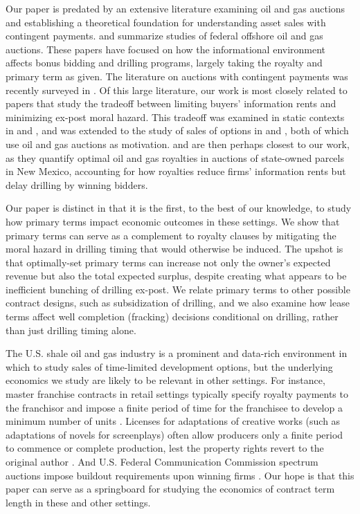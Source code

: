 \documentclass[12pt]{article}
\begin{document}
Our paper is predated by an extensive literature examining oil and gas auctions and establishing a theoretical foundation for understanding asset sales with contingent payments. \citet{bib:porter} and \citet{bib:haile} summarize studies of federal offshore oil and gas auctions. These papers have focused on how the informational environment affects bonus bidding and drilling programs, largely taking the royalty and primary term as given. The literature on auctions with contingent payments was recently surveyed in \citet{bib:skrzypacz}. Of this large literature, our work is most closely related to papers that study the tradeoff between limiting buyers' information rents and minimizing ex-post moral hazard. This tradeoff was examined in static contexts in \citet{bib:laffonttirole1986} and \citet{bib:mcafee}, and was extended to the study of sales of options in \citet{bib:board} and \citet{bib:cong}, both of which use oil and gas auctions as motivation. \citet{bib:bhattacharya} and \citet{bib:ordin} are then perhaps closest to our work, as they quantify optimal oil and gas royalties in auctions of state-owned parcels in New Mexico, accounting for how royalties reduce firms' information rents but delay drilling by winning bidders.

Our paper is distinct in that it is the first, to the best of our knowledge, to study how primary terms impact economic outcomes in these settings. We show that primary terms can serve as a complement to royalty clauses by mitigating the moral hazard in drilling timing that would otherwise be induced. The upshot is that optimally-set primary terms can increase not only the owner's expected revenue but also the total expected surplus, despite creating what appears to be inefficient bunching of drilling ex-post. We relate primary terms to other possible contract designs, such as subsidization of drilling, and we also examine how lease terms affect well completion (fracking) decisions conditional on drilling, rather than just drilling timing alone.

The U.S. shale oil and gas industry is a prominent and data-rich environment in which to study sales of time-limited development options, but the underlying economics we study are likely to be relevant in other settings. For instance, master franchise contracts in retail settings typically specify royalty payments to the franchisor and impose a finite period of time for the franchisee to develop a minimum number of units \citep{bib:kalnins}. Licenses for adaptations of creative works (such as adaptations of novels for screenplays) often allow producers only a finite period to commence or complete production, lest the property rights revert to the original author \citep{bib:litwak}. And U.S. Federal Communication Commission spectrum auctions impose buildout requirements upon winning firms \citep{bib:cramton,bib:GAO}. Our hope is that this paper can serve as a springboard for studying the economics of contract term length in these and other settings.
\end{document}
